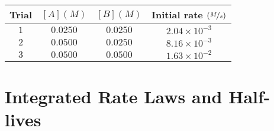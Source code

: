 \documentclass[12pt, openany, letterpaper]{memoir}
\begin{document}
\begin{itemize}
	
	\begin{tabular}{c|c|c|c}
		Trial & $\left[A\right](M)$ & $\left[B\right](M)$ & Initial rate $\left(\nicefrac{M}{s}\right)$ \\ \midrule
		$1$ & $0.0250$ & $0.0250$ & $2.04\times10^{-3}$ \\
		$2$ & $0.0500$ & $0.0250$ & $8.16\times10^{-3}$ \\
		$3$ & $0.0500$ & $0.0500$ & $1.63\times10^{-2}$ \\
	\end{tabular}
\end{itemize}
\section{Integrated Rate Laws and Half-lives}
\end{document}
